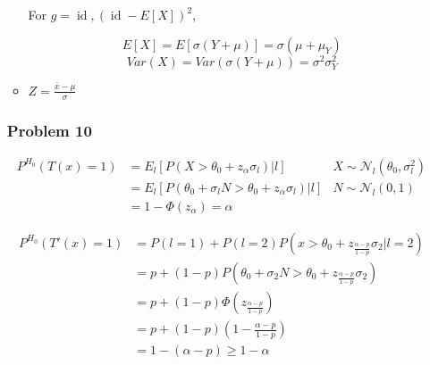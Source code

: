 \documentclass[12pt]{article}
\newcommand{\Q}[1]{\subsubsection*{Problem #1}}
\begin{document}
\begin{itemize}
\begin{itemize}
For $g = \operatorname{id}, (\operatorname{id} - E[X] )^2$, 

$$E[X] = E[\sigma(Y + \mu)] = \sigma(\mu + \mu_Y)$$
$$Var(X) = Var(\sigma(Y + \mu)) = \sigma^2 \sigma_Y^2$$

\item

$Z = \frac{\bar x - \mu}{\sigma} $
\end{itemize}


\Q{10}
\begin{align}
P^{H_0}(T(x) = 1) &= E_l[P(X > \theta_0 + z_{\alpha} \sigma_l) | l] & X \sim \mathcal N_l(\theta_0, \sigma_l^2)\\
&= E_l[P(\theta_0 + \sigma_l N > \theta_0 + z_{\alpha} \sigma_l) | l] & N \sim \mathcal N_l(0, 1)\\
&= 1 - \Phi(z_{\alpha}) = \alpha
\end{align}


\begin{align}
P^{H_0}(T'(x) = 1) &= P(l = 1) + P(l = 2)P(x > \theta_0  + z_{\frac{\alpha-p}{1-p}}\sigma_2 | l=2) \\
&= p + (1-p) P(\theta_0 + \sigma_2 N > \theta_0  + z_{\frac{\alpha-p}{1-p}}\sigma_2) \\
&= p + (1-p) \Phi(z_{\frac{\alpha-p}{1-p}})\\
&= p + (1-p)(1 - \frac{\alpha-p}{1-p})\\
&= 1 - (\alpha-p) \ge 1 - \alpha
\end{align}



\end{itemize}
\end{document}
